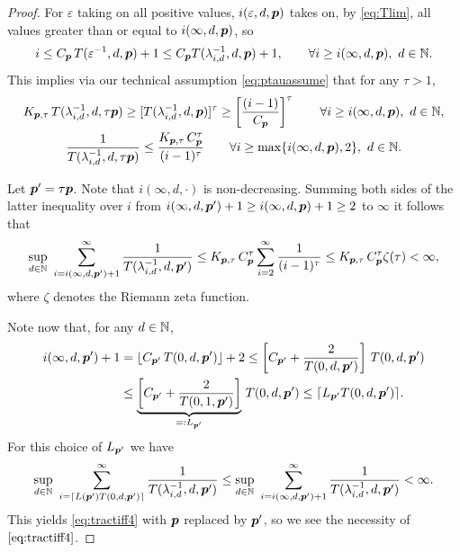 \documentclass[sort&compress]{elsarticle}
\newcommand{\peter}[1]{\begingroup\color{violet}#1\endgroup}
\begin{document}
\begin{proof}
For $\varepsilon$ taking on all positive values, $i(\varepsilon,d,\boldsymbol{p})$ takes on, \peter{by \eqref{eq:Tlim},} all values greater than or equal to $i(\infty,d,\boldsymbol{p})$, so
\[
i\le C_{\boldsymbol{p}}\, T(\varepsilon^{-1},d,\boldsymbol{p})+1 \le C_{\boldsymbol{p}} T(\lambda_{i,d}^{-1},d,\boldsymbol{p})+1, \qquad \forall i \ge i(\infty,d,\boldsymbol{p}),  \ d \in \mathbb{N}.
\]
This implies via our technical assumption \eqref{eq:ptauassume} that for any $\tau > 1$,
\begin{gather*}
	K_{\boldsymbol{p},\tau}\,T (\lambda_{i,d}^{-1},d,\tau \boldsymbol{p}) \ge
	[T(\lambda_{i,d}^{-1},d, \boldsymbol{p})]^\tau
	\ge
	\left[\frac{(i-1)}{C_{\boldsymbol{p}}}\right]^\tau \qquad \forall i \ge i(\infty,d,\boldsymbol{p}),  \ d \in \mathbb{N}, \\
	 \frac{1}{T (\lambda_{i,d}^{-1},d,\tau \boldsymbol{p})} \le
	\frac{K_{\boldsymbol{p},\tau}\, C_{\boldsymbol{p}}^\tau}{(i-1)^\tau}\qquad \forall i \ge \max\{i(\infty,d,\boldsymbol{p}),2\},  \ d \in \mathbb{N}.
\end{gather*}

Let $\boldsymbol{p}' = \tau \boldsymbol{p}$.  Note that $i(\infty,d,\cdot)$ is non-decreasing.  Summing both sides of the latter inequality over $i$ from $i(\infty,d,\boldsymbol{p}') + 1 \ge i(\infty,d, \boldsymbol{p}) + 1 \ge 2$ to $\infty$ it follows that
\begin{equation*}
	\sup_{d\in\mathbb{N}} \, \, \sum_{i=i (\infty,d,\boldsymbol{p}')+1}^\infty \frac{1}{T (\lambda_{i,d}^{-1},d,\boldsymbol{p}')}
	 \le  K_{\boldsymbol{p},\tau}\, C_{\boldsymbol{p}}^\tau
	\sum_{i=2}^\infty \frac{1}{(i-1)^\tau} \\
	 \le  K_{\boldsymbol{p},\tau}\, C_{\boldsymbol{p}}^\tau
	\zeta (\tau)  < \infty,
\end{equation*}
where $\zeta$ denotes the Riemann zeta function.


Note now that, for any $d\in\mathbb{N}$,
\begin{align*}
 i(\infty,d,\boldsymbol{p}') +1  & = \lfloor C_{\boldsymbol{p}'}\, T(0,d,\boldsymbol{p}')\rfloor +2 \le  \left[C_{\boldsymbol{p}'} + \frac{2}{T(0,d,\boldsymbol{p}')}   \right]\, T(0,d,\boldsymbol{p}')\\
 & \le  \underbrace{\left[C_{\boldsymbol{p}'} + \frac{2}{T(0,1,\boldsymbol{p}')}   \right]}_{=:L_{\boldsymbol{p}'}}\, T(0,d,\boldsymbol{p}')
 \le \lceil L_{\boldsymbol{p}'} T(0,d,\boldsymbol{p}')\rceil .
\end{align*}
For this choice of $L_{\boldsymbol{p}'}$ we have
\[
\sup_{d\in\mathbb{N}}\,\, \sum_{i=\lceil L(\boldsymbol{p}') T(0,d,\boldsymbol{p}')\rceil}^\infty \frac{1}{T(\lambda_{i,d}^{-1},d, \boldsymbol{p}')}
\le
\sup_{d\in\mathbb{N}} \, \, \sum_{i=i (\infty,d,\boldsymbol{p}')+1}^\infty \frac{1}{T (\lambda_{i,d}^{-1},d,\boldsymbol{p}')} <
\infty.
\]
This yields \eqref{eq:tractiff4} with $\boldsymbol{p}$ replaced by $\boldsymbol{p}'$, so we see the necessity of $\eqref{eq:tractiff4}$.

\bigskip


\end{proof}
\end{document}
